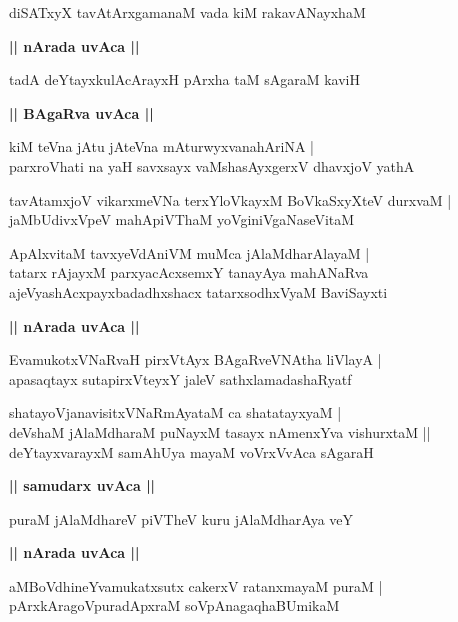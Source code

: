 \documentclass[twoside,12pt,openright]{book}
\newcounter{shloka}[chapter]
\def\uvaca#1{\centerline{{\large\textbf{#1}}}}
\begin{document}
\begin{shloka}%
diSATxyX tavAtArxgamanaM vada kiM rakavANayxhaM 
\end{shloka}

\uvaca{|| nArada uvAca ||}

\begin{shloka}%
tadA deYtayxkulAcArayxH pArxha taM sAgaraM kaviH 
\end{shloka}
\uvaca{|| BAgaRva uvAca ||}

\begin{shloka}%
kiM teVna jAtu jAteVna mAturwyxvanahAriNA |\\
parxroVhati na yaH savxsayx vaMshasAyxgerxV dhavxjoV yathA 
\end{shloka}

\begin{shloka}%
tavAtamxjoV vikarxmeVNa terxYloVkayxM BoVkaSxyXteV durxvaM |\\
jaMbUdivxVpeV mahApiVThaM yoVginiVgaNaseVitaM 
\end{shloka}

\begin{shloka}%
ApAlxvitaM tavxyeVdAniVM muMca jAlaMdharAlayaM |\\
tatarx rAjayxM parxyacAcxsemxY tanayAya mahANaRva\\
ajeVyashAcxpayxbadadhxshacx tatarxsodhxVyaM BaviSayxti 
\end{shloka}

\uvaca{|| nArada uvAca ||}

\begin{shloka}%
EvamukotxVNaRvaH pirxVtAyx BAgaRveVNAtha liVlayA |\\
apasaqtayx sutapirxVteyxY jaleV sathxlamadashaRyatf
\end{shloka}

\begin{shloka}%
shatayoVjanavisitxVNaRmAyataM ca shatatayxyaM |\\
deVshaM jAlaMdharaM puNayxM tasayx nAmenxYva vishurxtaM ||\\
deYtayxvarayxM samAhUya mayaM voVrxVvAca sAgaraH
\end{shloka}

\uvaca{|| samudarx uvAca ||}

\begin{shloka}%
puraM jAlaMdhareV piVTheV kuru jAlaMdharAya veY
\end{shloka}

\uvaca{|| nArada uvAca ||}

\begin{shloka}%
aMBoVdhineYvamukatxsutx cakerxV ratanxmayaM puraM |\\
pArxkAragoVpuradApxraM soVpAnagaqhaBUmikaM 
\end{shloka}
\end{document}
